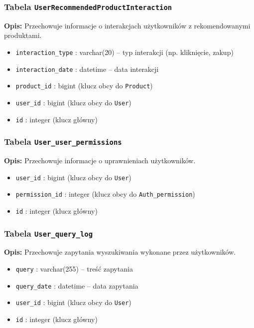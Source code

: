 \documentclass[12pt,a4paper,oneside]{article}
\theoremstyle{definition}
\numberwithin{equation}{section}
\begin{document}
\subsubsection*{Tabela \texttt{UserRecommendedProductInteraction}}
\textbf{Opis:} Przechowuje informacje o interakcjach użytkowników z rekomendowanymi produktami.
\begin{itemize}
    \item \texttt{interaction\string_type} : varchar(20) – typ interakcji (np. kliknięcie, zakup)
    \item \texttt{interaction\string_date} : datetime – data interakcji
    \item \texttt{product\string_id} : bigint (klucz obcy do \texttt{Product})
    \item \texttt{user\string_id} : bigint (klucz obcy do \texttt{User})
    \item \texttt{id} : integer (klucz główny)
\end{itemize}

\subsubsection*{Tabela \texttt{User\string_user\string_permissions}}
\textbf{Opis:} Przechowuje informacje o uprawnieniach użytkowników.
\begin{itemize}
    \item \texttt{user\string_id} : bigint (klucz obcy do \texttt{User})
    \item \texttt{permission\string_id} : integer (klucz obcy do \texttt{Auth\string_permission})
    \item \texttt{id} : integer (klucz główny)
\end{itemize}

\subsubsection*{Tabela \texttt{User\string_query\string_log}}
\textbf{Opis:} Przechowuje zapytania wyszukiwania wykonane przez użytkowników.
\begin{itemize}
    \item \texttt{query} : varchar(255) – treść zapytania
    \item \texttt{query\string_date} : datetime – data zapytania
    \item \texttt{user\string_id} : bigint (klucz obcy do \texttt{User})
    \item \texttt{id} : integer (klucz główny)
\end{itemize}
\end{document}

